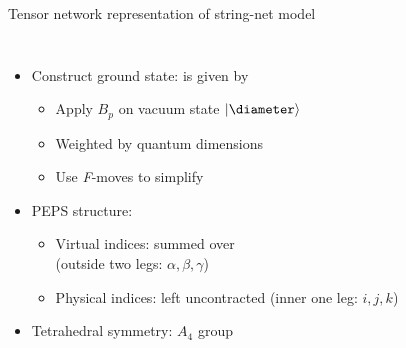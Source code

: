 \documentclass{fdubeamer}
\newcommand{\1}{\mathbb{1}}
\begin{document}
\begin{frame}{Tensor network representation of string-net model}

\begin{columns}[c]


    \begin{itemize}
      \item Construct ground state: is given by 

        \begin{itemize}
          \item Apply $B_p$ on vacuum state $\ket{\diameter}$
          \item Weighted by quantum dimensions
          \item Use \textit{F}-moves to simplify
        \end{itemize}

      \item PEPS structure:

        \begin{itemize}
          \item Virtual indices: summed over \\
            \mbox{\qquad} (outside two legs: $\alpha,\beta,\gamma$)
          \item Physical indices: left uncontracted
            \mbox{\qquad} (inner one leg: $i,j,k$)
        \end{itemize}

      \item Tetrahedral symmetry: $A_4$ group
    \end{itemize}



\end{columns}
\end{frame}
\end{document}
